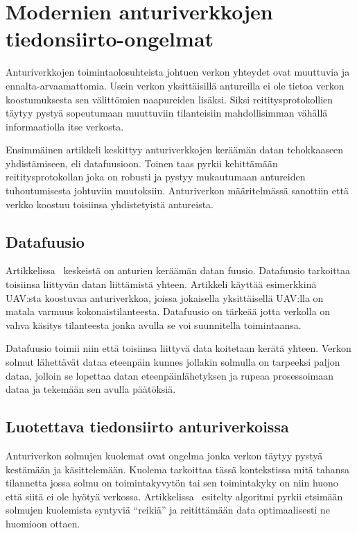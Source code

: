 \section{Modernien anturiverkkojen tiedonsiirto-ongelmat}

Anturiverkkojen toimintaolosuhteista johtuen verkon yhteydet ovat muuttuvia ja
ennalta-arvaamattomia. Usein verkon yksittäisillä antureilla ei ole tietoa
verkon koostumuksesta sen välittömien naapureiden lisäksi. Siksi
reititysprotokollien täytyy pystyä sopeutumaan muuttuviin tilanteisiin
mahdollisimman vähällä informaatiolla itse verkosta.

Ensimmäinen artikkeli keskittyy anturiverkkojen keräämän datan tehokkaaseen
yhdistämiseen, eli datafuusioon. Toinen taas pyrkii kehittämään
reititysprotokollan joka on robusti ja pystyy mukautumaan antureiden
tuhoutumisesta johtuviin muutoksiin. Anturiverkon määritelmässä sanottiin että
verkko koostuu toisiinsa yhdistetyistä antureista.

\subsection{Datafuusio}
Artikkelissa~\cite{Yu2006} keskeistä on anturien keräämän datan fuusio.
Datafuusio tarkoittaa toisiinsa liittyvän datan liittämistä yhteen. Artikkeli
käyttää esimerkkinä UAV:sta koostuvaa anturiverkkoa, joissa jokaisella
yksittäisellä UAV:lla on matala varmuus kokonaistilanteesta. Datafuusio on
tärkeää jotta verkolla on vahva käsitys tilanteesta jonka avulla se voi
suunnitella toimintaansa.

Datafuusio toimii niin että toisiinsa liittyvä data koitetaan kerätä yhteen.
Verkon solmut lähettävät dataa eteenpäin kunnes jollakin solmulla on tarpeeksi
paljon dataa, jolloin se lopettaa datan eteenpäinlähetyksen ja rupeaa
prosessoimaan dataa ja tekemään sen avulla päätöksiä.

\subsection{Luotettava tiedonsiirto anturiverkoissa}
Anturiverkon solmujen kuolemat ovat ongelma jonka verkon täytyy pystyä
kestämään ja käsittelemään. Kuolema tarkoittaa tässä kontekstissa mitä tahansa
tilannetta jossa solmu on toimintakyvytön tai sen toimintakyky on niin huono
että siitä ei ole hyötyä verkossa. Artikkelissa~\cite{Arya2015} esitelty
algoritmi pyrkii etsimään solmujen kuolemista syntyviä ``reikiä'' ja
reitittämään data optimaalisesti ne huomioon ottaen.

